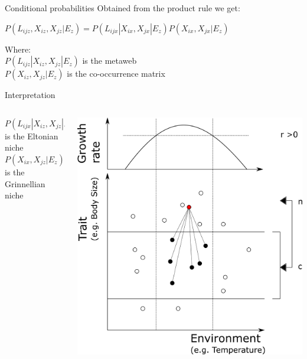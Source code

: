 \documentclass{eecslides}
\begin{document}

	\begin{frame}{Conditional probabilities}
	Obtained from the product rule we get:
		\begin{center}
			$P(L_{ijz},X_{iz},X_{jz}|E_z) = P(L_{ijx}|X_{ix},X_{jx}|E_z)P(X_{ix},X_{jx}|E_z)$
		\end{center}
	Where:\\
	$P(L_{ijz}|X_{iz},X_{jz}|E_z)$ is the metaweb\\
 	$P(X_{iz},X_{jz}|E_z)$ is the co-occurrence matrix
		
	\end{frame}


	\begin{frame}{Interpretation}
 	    	\begin{columns}
			\begin{column}{0.3\textwidth}			
				$P(L_{ijx}|X_{iz},X_{jz}|E_z)$ is the Eltonian niche\\
			 	$P(X_{ix},X_{jz}|E_z)$ is the Grinnellian niche
			\end{column}
			\begin{column}{0.7\textwidth}
				\begin{center}
					\includegraphics[height=0.65\textheight]{niche}\\
				\end{center}
			\end{column}				
		\end{columns}	   
	\end{frame}
\end{document}
